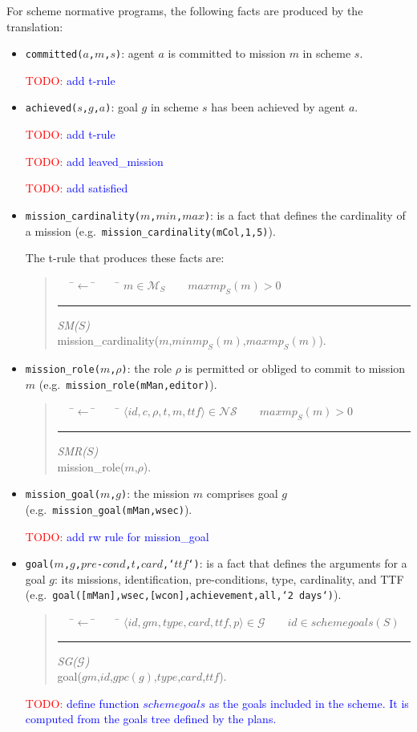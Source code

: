 \documentclass{article}
\newcommand{\todo}[1]{\textcolor{red}{TODO: }\textcolor{blue}{#1}}
\newcommand{\set}[1]{\mathcal{#1}}
\newcommand{\andalso}{\quad\quad}
\newcommand{\code}[1]{\texttt{#1}}
\newenvironment{rwrule}[2]
{\begin{quote}\ttfamily\begin{tabbing}~~~\=$\leftarrow$ \= ~~~ \= \kill
     \ensuremath{#2}\\
     \rule[2pt]{6.5cm}{.3pt} \hfill \rwlabel{#1}\\}
{\end{tabbing}\end{quote}}
\newcommand{\rwlabel}[1]{{\scshape\itshape\textrm{#1}}}
\theoremstyle{definition} \newtheorem{definition}{Definition}
\begin{document}
For scheme normative programs, the following facts are
produced by the translation:
\begin{itemize}

\item \code{committed($a$,$m$,$s$)}: agent $a$ is committed to mission
  $m$ in scheme $s$.

  \todo{add t-rule}

\item \code{achieved($s$,$g$,$a$)}: goal $g$ in scheme $s$ has been
  achieved by agent $a$.

  \todo{add t-rule}

  \todo{add leaved\_mission}

  \todo{add satisfied}



\item \code{mission\_cardinality($m$,$min$,$max$)}: is a fact that defines
  the cardinality of a mission (e.g.\
  \code{mission\_cardinality(mCol,1,5)}).
  
  The t-rule that produces these facts are:

  \begin{rwrule}{SM($S$)}
    {m \in \set{M}_S \andalso maxmp_S(m) > 0}
    mission\_cardinality($m$,$minmp_S(m)$,$maxmp_S(m)$).
  \end{rwrule}

\item \code{mission\_role($m$,$\rho$)}: the role $\rho$ is permitted
  or obliged to commit to mission $m$ (e.g.\
  \code{mission\_role(mMan,editor)}).

  \begin{rwrule}{SMR($S$)}
    {\langle id, c, \rho, t, m, ttf \rangle \in \set{NS} \andalso maxmp_S(m) > 0}
    mission\_role($m$,$\rho$).
  \end{rwrule}

\item \code{mission\_goal($m$,$g$)}: the mission $m$ comprises goal
  $g$ (e.g.\ \code{mission\_goal(mMan,wsec)}).

\todo{add rw rule for mission\_goal}

\item \code{goal($m$,$g$,$pre$-$cond$,$t$,$card$,`$ttf$`)}: is a fact
  that defines the arguments for a goal $g$: its missions,
  identification, pre-conditions, type, cardinality, and TTF (e.g.\
  \code{goal([mMan],wsec,[wcon],achievement,all,`2 days`)}).

  \begin{rwrule}{SG($\set{G}$)}
    {\langle id, gm, type, card, ttf, p \rangle \in \set{G} \andalso id \in schemegoals(S)}
    goal($gm$,$id$,$gpc(g)$,$type$,$card$,$ttf$).
  \end{rwrule}

  \todo{define function $schemegoals$ as the goals included in the
    scheme. It is computed from the goals tree defined by the plans.}
\end{itemize}
\end{document}
